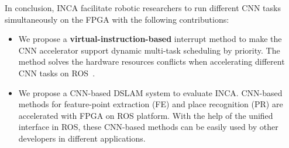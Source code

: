In conclusion, INCA facilitate robotic researchers to run different CNN tasks simultaneously on the FPGA with the following contributions:
\begin{itemize}
\item We propose a \textbf{virtual-instruction-based} interrupt method to make the CNN accelerator support dynamic multi-task scheduling by priority. The method solves the hardware resources conflicts when accelerating different CNN tasks on ROS~\cite{quigley2009ros}.
\item We propose a CNN-based DSLAM system to evaluate INCA. CNN-based methods for feature-point extraction (FE) and place recognition (PR) are accelerated with FPGA on ROS platform. With the help of the unified interface in ROS, these CNN-based methods can be easily used by other developers in different applications.
\end{itemize}

